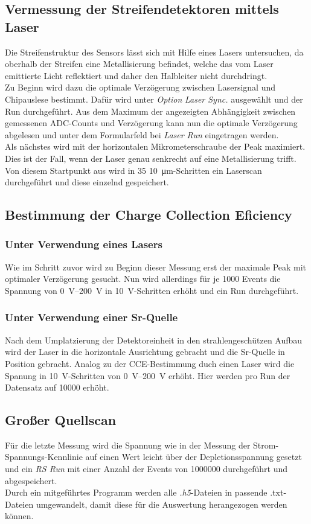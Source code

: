 \FloatBarrier
\subsection{Vermessung der Streifendetektoren mittels Laser}
\label{sec:Vermessung_Laser}
Die Streifenstruktur des Sensors lässt sich mit Hilfe eines Lasers untersuchen, da oberhalb der Streifen eine Metallisierung befindet, welche das vom Laser emittierte Licht reflektiert und daher den Halbleiter nicht durchdringt.\\
Zu Beginn wird dazu die optimale Verzögerung zwischen Lasersignal und Chipauslese bestimmt. Dafür wird unter \textit{Option} \textit{Laser Sync.} ausgewählt und der Run durchgeführt. Aus dem Maximum der angezeigten Abhängigkeit zwischen gemessenen ADC-Counts und Verzögerung kann nun die optimale Verzögerung abgelesen und unter dem Formularfeld bei \textit{Laser Run} eingetragen werden.\\
Als nächstes wird mit der horizontalen Mikrometerschraube der Peak maximiert. Dies ist der Fall, wenn der Laser genau senkrecht auf eine Metallisierung trifft. Von diesem Startpunkt aus wird in \num{35} \SI{10}{\micro\meter}-Schritten ein Laserscan durchgeführt und diese einzelnd gespeichert.


\subsection{Bestimmung der Charge Collection Eficiency}
\label{sec:CCE}
\subsubsection{Unter Verwendung eines Lasers}
Wie im Schritt zuvor wird zu Beginn dieser Messung erst der maximale Peak mit optimaler Verzögerung gesucht. Nun wird allerdings für je \num{1000} Events die Spannung von \SIrange{0}{200}{\volt} in \SI{10}{\volt}-Schritten erhöht und ein Run durchgeführt.

\subsubsection{Unter Verwendung einer Sr-Quelle}
Nach dem Umplatzierung der Detektoreinheit in den strahlengeschützen Aufbau wird der Laser in die horizontale Ausrichtung gebracht und die Sr-Quelle in Position gebracht. Analog zu der CCE-Bestimmung duch einen Laser wird die Spanung in \SI{10}{\volt}-Schritten von \SIrange{0}{200}{\volt} erhöht. Hier werden pro Run der Datensatz auf \num{10000} erhöht.

\subsection{Großer Quellscan}
\label{sec:Quellscan}
Für die letzte Messung wird die Spannung wie in der Messung der Strom-Spannungs-Kennlinie auf einen Wert leicht über der Depletionsspannung gesetzt und ein \textit{RS Run} mit einer Anzahl der Events von \num{1000000} durchgeführt und abgespeichert.\\

Durch ein mitgeführtes Programm werden alle \textit{.h5}-Dateien in passende .txt-Dateien
umgewandelt, damit diese für die Auswertung herangezogen werden können.
